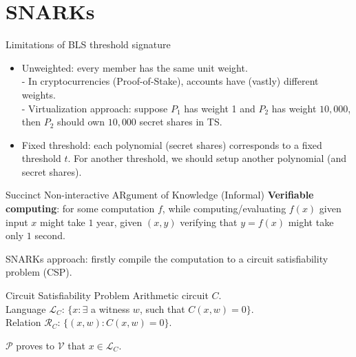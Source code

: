 \section{SNARKs}

\begin{frame}{Limitations of BLS threshold signature}
\begin{itemize}
    \item Unweighted: every member has the same unit weight. \\
        - In cryptocurrencies (Proof-of-Stake), accounts have (vastly) different weights. \\
        - Virtualization approach: suppose $P_1$ has weight 1 and $P_2$ has weight $10,000$, then $P_2$ should own $10,000$ secret shares in TS. \pause 
    \item Fixed threshold: each polynomial (secret shares) corresponds to a fixed threshold $t$. For another threshold, we should setup another polynomial (and secret shares). 
\end{itemize}
\end{frame}



\begin{frame}{Succinct Non-interactive ARgument of Knowledge (Informal)}
    \textbf{Verifiable computing}: for some computation $f$, while computing/evaluating $f(x)$ given input $x$ might take $1$ year, given $(x, y)$ verifying that $y=f(x)$ might take only $1$ second. 
    
    SNARKs approach: firstly compile the computation to a circuit satisfiability problem (CSP). 
    
    \begin{block}{Circuit Satisfiability Problem}
    Arithmetic circuit $C$. \\
    Language $\mathcal{L}_{C}$: $\{ x: \exists$ a witness $w$, such that $C(x, w) = 0\}$.  \\
    Relation $\mathcal{R}_C$: $\{(x, w): C(x, w)=0\}$. 
    \end{block}
    
    $\mathcal{P}$ proves to $\mathcal{V}$ that $x\in \mathcal{L}_C$. \\
    
        
    \end{frame}


